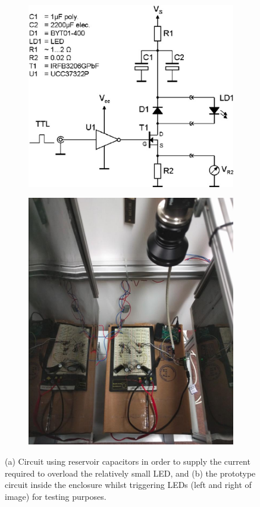 \documentclass[fleqn,twoside]{article}
\begin{document}
\begin{figure}[h]
	\centering
	\begin{subfigure}{0.5\textwidth}
		\centering
		\includegraphics[width=0.9\linewidth]{pulse_circuit.png}
		\caption{}
		\label{fig:pulse_circuit}
	\end{subfigure}%
	\begin{subfigure}{0.5\textwidth}
		\centering
		\includegraphics[width=0.8\linewidth]{breadboard.jpg}
		\caption{}
		\label{fig:breadboard}
	\end{subfigure}%
	\caption{(a) Circuit using reservoir capacitors in order to supply the current required to overload the relatively small LED, and (b) the prototype circuit inside the enclosure whilst triggering LEDs (left and right of image) for testing purposes.}
	\label{}
\end{figure}
\end{document}
